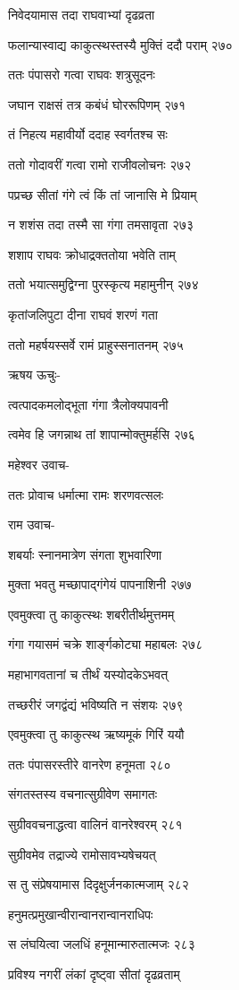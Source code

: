 निवेदयामास तदा राघवाभ्यां दृढव्रता

फलान्यास्वाद्य काकुत्स्थस्तस्यै मुक्तिं ददौ पराम् २७०

ततः पंपासरो गत्वा राघवः शत्रुसूदनः

जघान राक्षसं तत्र कबंधं घोररूपिणम् २७१

तं निहत्य महावीर्यो ददाह स्वर्गतश्च सः

ततो गोदावरीं गत्वा रामो राजीवलोचनः २७२

पप्रच्छ सीतां गंगे त्वं किं तां जानासि मे प्रियाम्

न शशंस तदा तस्मै सा गंगा तमसावृता २७३

शशाप राघवः क्रोधाद्रक्ततोया भवेति ताम्

ततो भयात्समुद्विग्ना पुरस्कृत्य महामुनीन् २७४

कृतांजलिपुटा दीना राघवं शरणं गता

ततो महर्षयस्सर्वे रामं प्राहुस्सनातनम् २७५

ऋषय ऊचुः-

त्वत्पादकमलोद्भूता गंगा त्रैलोक्यपावनी

त्वमेव हि जगन्नाथ तां शापान्मोक्तुमर्हसि २७६

महेश्वर उवाच-

ततः प्रोवाच धर्मात्मा रामः शरणवत्सलः

राम उवाच-

शबर्याः स्नानमात्रेण संगता शुभवारिणा

मुक्ता भवतु मच्छापाद्गंगेयं पापनाशिनी २७७

एवमुक्त्वा तु काकुत्स्थः शबरीतीर्थमुत्तमम्

गंगा गयासमं चक्रे शार्ङ्गकोट्या महाबलः २७८

महाभागवतानां च तीर्थं यस्योदकेऽभवत्

तच्छरीरं जगद्वंद्यं भविष्यति न संशयः २७९

एवमुक्त्वा तु काकुत्स्थ ऋष्यमूकं गिरिं ययौ

ततः पंपासरस्तीरे वानरेण हनूमता २८०

संगतस्तस्य वचनात्सुग्रीवेण समागतः

सुग्रीववचनाद्धत्वा वालिनं वानरेश्वरम् २८१

सुग्रीवमेव तद्राज्ये रामोसावभ्यषेचयत्

स तु संप्रेषयामास दिदृक्षुर्जनकात्मजाम् २८२

हनुमत्प्रमुखान्वीरान्वानरान्वानराधिपः

स लंघयित्वा जलधिं हनूमान्मारुतात्मजः २८३

प्रविश्य नगरीं लंकां दृष्ट्वा सीतां दृढव्रताम्

